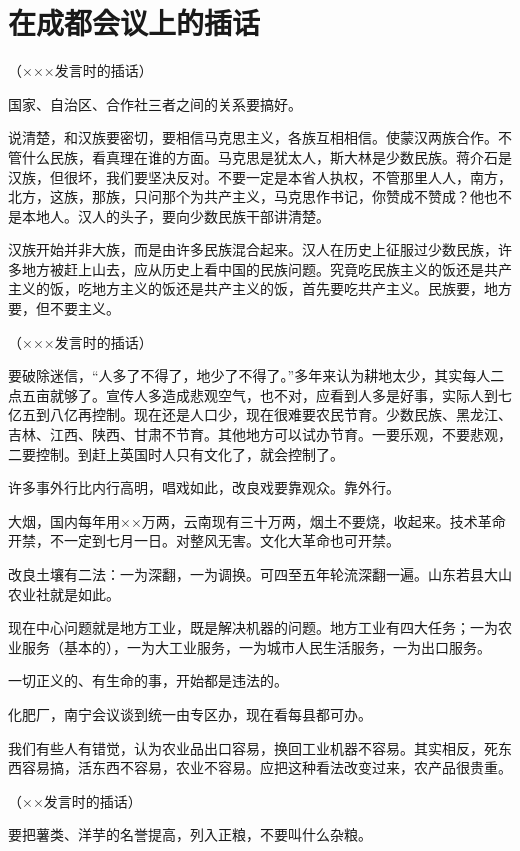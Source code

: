 \section[在成都会议上的插话（一九五八年三月）]{在成都会议上的插话}


（×××发言时的插话）

国家、自治区、合作社三者之间的关系要搞好。

说清楚，和汉族要密切，要相信马克思主义，各族互相相信。使蒙汉两族合作。不管什么民族，看真理在谁的方面。马克思是犹太人，斯大林是少数民族。蒋介石是汉族，但很坏，我们要坚决反对。不要一定是本省人执权，不管那里人人，南方，北方，这族，那族，只问那个为共产主义，马克思作书记，你赞成不赞成？他也不是本地人。汉人的头子，要向少数民族干部讲清楚。

汉族开始并非大族，而是由许多民族混合起来。汉人在历史上征服过少数民族，许多地方被赶上山去，应从历史上看中国的民族问题。究竟吃民族主义的饭还是共产主义的饭，吃地方主义的饭还是共产主义的饭，首先要吃共产主义。民族要，地方要，但不要主义。

（×××发言时的插话）

要破除迷信，“人多了不得了，地少了不得了。”多年来认为耕地太少，其实每人二点五亩就够了。宣传人多造成悲观空气，也不对，应看到人多是好事，实际人到七亿五到八亿再控制。现在还是人口少，现在很难要农民节育。少数民族、黑龙江、吉林、江西、陕西、甘肃不节育。其他地方可以试办节育。一要乐观，不要悲观，二要控制。到赶上英国时人只有文化了，就会控制了。

许多事外行比内行高明，唱戏如此，改良戏要靠观众。靠外行。

大烟，国内每年用××万两，云南现有三十万两，烟土不要烧，收起来。技术革命开禁，不一定到七月一日。对整风无害。文化大革命也可开禁。

改良土壤有二法：一为深翻，一为调换。可四至五年轮流深翻一遍。山东若县大山农业社就是如此。

现在中心问题就是地方工业，既是解决机器的问题。地方工业有四大任务；一为农业服务（基本的），一为大工业服务，一为城市人民生活服务，一为出口服务。

一切正义的、有生命的事，开始都是违法的。

化肥厂，南宁会议谈到统一由专区办，现在看每县都可办。

我们有些人有错觉，认为农业品出口容易，换回工业机器不容易。其实相反，死东西容易搞，活东西不容易，农业不容易。应把这种看法改变过来，农产品很贵重。

（××发言时的插话）

要把薯类、洋芋的名誉提高，列入正粮，不要叫什么杂粮。

